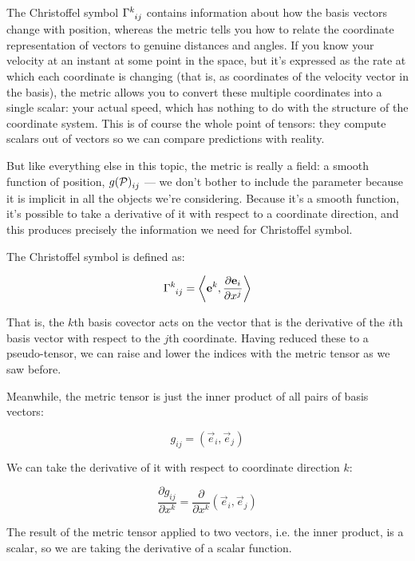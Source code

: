 The Christoffel symbol $\Gamma\indices{^k_i_j}$ contains information about how the basis vectors change with position, whereas the metric tells you how to relate the coordinate representation of vectors to genuine distances and angles. If you know your velocity at an instant at some point in the space, but it's expressed as the rate at which each coordinate is changing (that is, as coordinates of the velocity vector in the basis), the metric allows you to convert these multiple coordinates into a single scalar: your actual speed, which has nothing to do with the structure of the coordinate system. This is of course the whole point of tensors: they compute scalars out of vectors so we can compare predictions with reality.

But like everything else in this topic, the metric is really a field: a smooth function of position, $g(\mathcal{P})\indices{_i_j}$ --- we don't bother to include the parameter because it is implicit in all the objects we're considering. Because it's a smooth function, it's possible to take a derivative of it with respect to a coordinate direction, and this produces precisely the information we need for Christoffel symbol.

The Christoffel symbol is defined as:

\begin{equation}
    \Gamma\indices{^k_i_j}
=
\biggl<
\vec{e}^k,
\frac{\partial \vec{e}_i}{\partial x^j}
\biggr>
\end{equation}

That is, the $k$th basis covector acts on the vector that is the derivative of the $i$th basis vector with respect to the $j$th coordinate. Having reduced these to a pseudo-tensor, we can raise and lower the indices with the metric tensor as we saw before.

Meanwhile, the metric tensor is just the inner product of all pairs of basis vectors:

\begin{equation}
g_{ij} = \left( \vec{e}_i,\vec{e}_j \right)
\end{equation}

We can take the derivative of it with respect to coordinate direction $k$:

\begin{equation}
\frac{\partial g_{ij}}{\partial x^k} 
=
\frac{\partial}{\partial x^k}
\left(
\vec{e}_i,\vec{e}_j
 \right)
\end{equation}

The result of the metric tensor applied to two vectors, i.e. the inner product, is a scalar, so we are taking the derivative of a scalar function.

